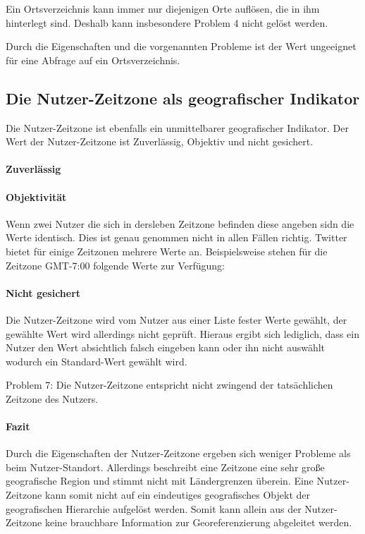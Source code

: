 				Ein Ortsverzeichnis kann immer nur diejenigen Orte auflösen, die in ihm hinterlegt sind.
				Deshalb kann insbesondere Problem 4 nicht gelöst werden.

				Durch die Eigenschaften und die vorgenannten Probleme ist der Wert ungeeignet für eine Abfrage auf ein Ortsverzeichnis.  


			\subsection{Die Nutzer-Zeitzone als geografischer Indikator}

				Die Nutzer-Zeitzone ist ebenfalls ein unmittelbarer geografischer Indikator. 
				Der Wert der Nutzer-Zeitzone ist Zuverlässig, Objektiv und nicht gesichert. 
				
				\paragraph{Zuverlässig}
					
				\paragraph{Objektivität}
					Wenn zwei Nutzer die sich in dersleben Zeitzone befinden diese angeben sidn die Werte identisch.
					Dies ist genau genommen nicht in allen Fällen richtig.
					Twitter bietet für einige Zeitzonen mehrere Werte an. 
					Beispielsweise stehen für die Zeitzone GMT-7:00 folgende Werte zur Verfügung:

					

				\paragraph{Nicht gesichert} 

				Die Nutzer-Zeitzone wird vom Nutzer aus einer Liste fester Werte gewählt, der gewählte Wert wird allerdings nicht geprüft.
				Hieraus ergibt sich lediglich, dass ein Nutzer den Wert absichtlich falsch eingeben kann oder ihn nicht auswählt wodurch ein Standard-Wert gewählt wird.

				Problem 7: Die Nutzer-Zeitzone entspricht nicht zwingend der tatsächlichen Zeitzone des Nutzers.

				\paragraph{Fazit}

				Durch die Eigenschaften der Nutzer-Zeitzone ergeben sich weniger Probleme als beim Nutzer-Standort.
				Allerdings beschreibt eine Zeitzone eine sehr große geografische Region und stimmt nicht mit Ländergrenzen überein.
				Eine Nutzer-Zeitzone kann somit nicht auf ein eindeutiges geografisches Objekt der geografischen Hierarchie aufgelöst werden.
				Somit kann allein aus der Nutzer-Zeitzone keine brauchbare Information zur Georeferenzierung abgeleitet werden. 
				
